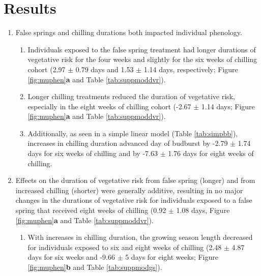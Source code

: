 \documentclass{article}\usepackage[]{graphicx}\usepackage[]{color}
\begin{document}
\section*{Results}
\begin{enumerate}
\item False springs and chilling durations both impacted individual phenology. 
  \begin{enumerate}
  \item Individuals exposed to the false spring treatment had longer durations of vegetative risk for the four weeks and slightly for the six weeks of chilling cohort (2.97 $\pm$ 0.79 days and 1.53 $\pm$ 1.14 days, respectively; Figure \ref{fig:muphen}\textbf{a} and Table \ref{tab:suppmoddvr}).
  \item Longer chilling treatments reduced the duration of vegetative risk, especially in the eight weeks of chilling cohort (-2.67 $\pm$ 1.14 days; Figure \ref{fig:muphen}\textbf{a} and Table \ref{tab:suppmoddvr}).
  \item Additionally, as seen in a simple linear model (Table \ref{tab:simpbb}), increases in chilling duration advanced day of budburst by -2.79 $\pm$ 1.74 days for six weeks of chilling and by -7.63 $\pm$ 1.76 days for eight weeks of chilling.
  \end{enumerate}
  
\item Effects on the duration of vegetative risk from false spring (longer) and from increased chilling (shorter) were generally additive, resulting in no major changes in the durations of vegetative risk for individuals exposed to a false spring that received eight weeks of chilling (0.92 $\pm$ 1.08 days, Figure \ref{fig:muphen}\textbf{a} and Table \ref{tab:suppmoddvr}). 
  \begin{enumerate}
  \item With increases in chilling duration, the growing season length decreased for individuals exposed to six and eight weeks of chilling (2.48 $\pm$ 4.87 days for six weeks and -9.66 $\pm$ 5 days for eight weeks; Figure \ref{fig:muphen}\textbf{b} and Table \ref{tab:suppmodgs}).
  \end{enumerate}
  

\end{enumerate}
\end{document}
